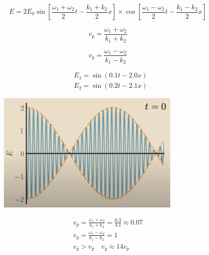 \begin{equation}
E=2 E_{0} \sin \left[\frac{\omega_{1}+\omega_{2}}{2} t-\frac{k_{1}+k_{2}}{2} x\right] \times \cos \left[\frac{\omega_{1}-\omega_{2}}{2} t-\frac{k_{1}-k_{2}}{2} x\right]
\end{equation}

\begin{equation}
v_p = \frac{\omega_{1}+\omega_{2}}{k_{1}+k_{2}}
\end{equation}

\begin{equation}
v_g = \frac{\omega_{1}-\omega_{2}}{k_{1}-k_{2}}
\end{equation}

\begin{equation}
\begin{aligned}
&E_{1}=\sin (0.1 t-2.0 x) \\
&E_{2}=\sin (0.2 t-2.1 x)
\end{aligned}
\end{equation}

\begin{figure}[H]
   \centering
    \includegraphics[width=0.8\textwidth]{lesson6/t=0.pdf}
    \label{fig: 1}
    
        \caption{}
    
\end{figure}

\begin{equation}
\begin{gathered}
v_{p}=\frac{\omega_{1}+\omega_{2}}{k_{1}+k_{2}}=\frac{0.3}{4.1} \approx 0.07 \\
v_{g}=\frac{\omega_{1}-\omega_{2}}{k_{1}-k_{2}}=1 
\begin{array}{l}
\end{array} \\
v_{g}>v_{p} \quad v_{g} \approx 14 v_{p}
\end{gathered}
\end{equation}

